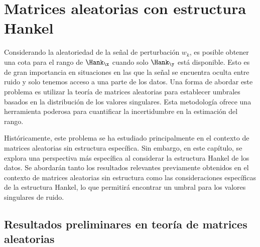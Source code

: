 \chapter{Matrices aleatorias con estructura Hankel}\label{chap:RandomHankel}

	Considerando la aleatoriedad de la señal de perturbación $w_k$, es posible obtener una cota para el rango de $\Hank_{\x}$ cuando solo $\Hank_{\y}$ está disponible. Esto es de gran importancia en situaciones en las que la señal se encuentra oculta entre ruido y solo tenemos acceso a una parte de los datos. Una forma de abordar este problema es utilizar la teoría de matrices aleatorias para establecer umbrales basados en la distribución de los valores singulares. Esta metodología ofrece una herramienta poderosa para cuantificar la incertidumbre en la estimación del rango.
    
    Históricamente, este problema se ha estudiado principalmente en el contexto de matrices aleatorias sin estructura específica. Sin embargo, en este capítulo, se explora una perspectiva más específica al considerar la estructura Hankel de los datos. Se abordarán tanto los resultados relevantes previamente obtenidos en el contexto de matrices aleatorias sin estructura como las consideraciones específicas de la estructura Hankel, lo que permitirá encontrar un umbral para los valores singulares de ruido.


\section{Resultados preliminares en teoría de matrices aleatorias}


